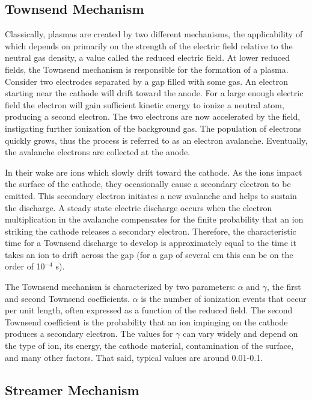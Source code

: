 \subsection{Townsend Mechanism}

Classically, plasmas are created by two different mechanisms, the applicability
of which depends on primarily on the strength of the electric field relative to
the neutral gas density, a value called the reduced electric field. At lower
reduced fields, the Townsend mechanism is responsible for the formation of a
plasma. Consider two electrodes separated by a gap filled with some gas. An
electron starting near the cathode will drift toward the anode. For a large
enough electric field the electron will gain sufficient kinetic energy to ionize
a neutral atom, producing a second electron. The two electrons are now
accelerated by the field, instigating further ionization of the background gas.
The population of electrons quickly grows, thus the process is referred to as an
electron avalanche. Eventually, the avalanche electrons are collected at the
anode.

In their wake are ions which slowly drift toward the cathode. As the ions impact
the surface of the cathode, they occasionally cause a secondary electron to be
emitted. This secondary electron initiates a new avalanche and helps to sustain
the discharge. A steady state electric discharge occurs when the electron
multiplication in the avalanche compensates for the finite probability that an
ion striking the cathode releases a secondary electron. Therefore, the
characteristic time for a Townsend discharge to develop is approximately equal
to the time it takes an ion to drift across the gap (for a gap of several cm
this can be on the order of 10$^{-4}$ s).

The Townsend mechanism is characterized by two parameters: $\alpha$ and
$\gamma$, the first and second Townsend coefficients. $\alpha$ is the number of
ionization events that occur per unit length, often expressed as a function of
the reduced field. The second Townsend coefficient is the probability that an
ion impinging on the cathode produces a secondary electron. The values for
$\gamma$ can vary widely and depend on the type of ion, its energy, the cathode
material, contamination of the surface, and many other factors. That said,
typical values are around 0.01-0.1.

\subsection{Streamer Mechanism}

